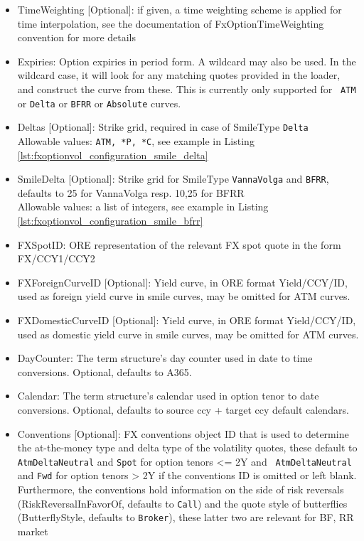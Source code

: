 \begin{itemize}
\item TimeWeighting [Optional]: if given, a time weighting scheme is applied for time interpolation, see the
  documentation of FxOptionTimeWeighting convention for more details
\item Expiries: Option expiries in period form. A wildcard may also be used. In the wildcard case, it will look for any
  matching quotes provided in the loader, and construct the curve from these. This is currently only supported for {\tt
    ATM} or {\tt Delta} or {\tt BFRR} or {\tt Absolute} curves.
\item Deltas [Optional]: Strike grid, required in case of SmileType {\tt Delta} \\ Allowable values: {\tt ATM, *P, *C},
  see example in Listing \ref{lst:fxoptionvol_configuration_smile_delta}
\item SmileDelta [Optional]: Strike grid for SmileType {\tt VannaVolga} and {\tt BFRR}, defaults to 25 for VannaVolga
  resp. 10,25 for BFRR \\ Allowable values: a list of integers, see example in Listing
  \ref{lst:fxoptionvol_configuration_smile_bfrr}
\item FXSpotID: ORE representation of the relevant FX spot quote in the form FX/CCY1/CCY2
\item FXForeignCurveID [Optional]: Yield curve, in ORE format Yield/CCY/ID, used as foreign yield curve in smile curves,
  may be omitted for ATM curves.
\item FXDomesticCurveID [Optional]: Yield curve, in ORE format Yield/CCY/ID, used as domestic yield curve in smile
  curves, may be omitted for ATM curves.
\item DayCounter: The term structure's day counter used in date to time conversions. Optional, defaults to A365.
\item Calendar: The term structure's calendar used in option tenor to date conversions. Optional, defaults to source ccy
  + target ccy default calendars.
\item Conventions [Optional]: FX conventions object ID that is used to determine the at-the-money type and delta type of
  the volatility quotes, these default to {\tt AtmDeltaNeutral} and {\tt Spot} for option tenors <= 2Y and {\tt
    AtmDeltaNeutral} and {\tt Fwd} for option tenors > 2Y if the conventions ID is omitted or left blank. Furthermore,
  the conventions hold information on the side of risk reversals (RiskReversalInFavorOf, defaults to {\tt Call}) and the
  quote style of butterflies (ButterflyStyle, defaults to {\tt Broker}), these latter two are relevant for BF, RR market

\end{itemize}
